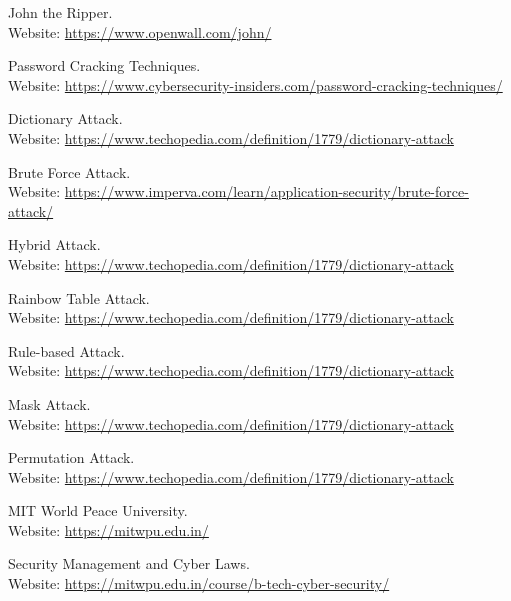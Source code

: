 \documentclass[11pt]{article}
\begin{document}
\begin{thebibliography}{99}
    John the Ripper. \\
    Website: \url{https://www.openwall.com/john/}

    Password Cracking Techniques. \\
    Website: \url{https://www.cybersecurity-insiders.com/password-cracking-techniques/}

    Dictionary Attack. \\
    Website: \url{https://www.techopedia.com/definition/1779/dictionary-attack}

    Brute Force Attack. \\
    Website: \url{https://www.imperva.com/learn/application-security/brute-force-attack/}

    Hybrid Attack. \\
    Website: \url{https://www.techopedia.com/definition/1779/dictionary-attack}

    Rainbow Table Attack. \\
    Website: \url{https://www.techopedia.com/definition/1779/dictionary-attack}

    Rule-based Attack. \\
    Website: \url{https://www.techopedia.com/definition/1779/dictionary-attack}

    Mask Attack. \\
    Website: \url{https://www.techopedia.com/definition/1779/dictionary-attack}

    Permutation Attack. \\
    Website: \url{https://www.techopedia.com/definition/1779/dictionary-attack}

    MIT World Peace University. \\
    Website: \url{https://mitwpu.edu.in/}

    Security Management and Cyber Laws. \\
    Website: \url{https://mitwpu.edu.in/course/b-tech-cyber-security/}
\end{thebibliography}
\end{document}
